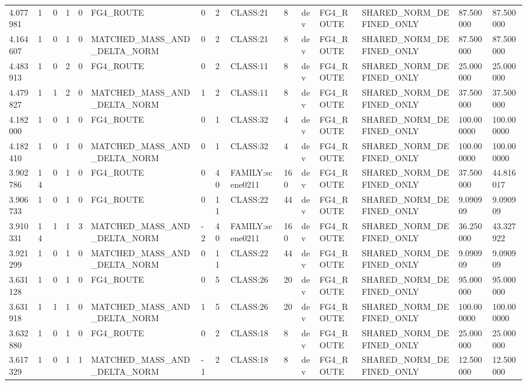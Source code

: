 \begin{tabular}{lllllllllllllll}
4.077981 & 1 & 0 & 1 & 0 & FG4\_ROUTE & 0 & 2 & CLASS:21 & 8 & dev & FG4\_ROUTE & SHARED\_NORM\_DEFINED\_ONLY & 87.500000 & 87.500000 \\
4.164607 & 1 & 0 & 1 & 0 & MATCHED\_MASS\_AND\_DELTA\_NORM & 0 & 2 & CLASS:21 & 8 & dev & FG4\_ROUTE & SHARED\_NORM\_DEFINED\_ONLY & 87.500000 & 87.500000 \\
4.483913 & 1 & 0 & 2 & 0 & FG4\_ROUTE & 0 & 2 & CLASS:11 & 8 & dev & FG4\_ROUTE & SHARED\_NORM\_DEFINED\_ONLY & 25.000000 & 25.000000 \\
4.479827 & 1 & 1 & 2 & 0 & MATCHED\_MASS\_AND\_DELTA\_NORM & 1 & 2 & CLASS:11 & 8 & dev & FG4\_ROUTE & SHARED\_NORM\_DEFINED\_ONLY & 37.500000 & 37.500000 \\
4.182000 & 1 & 0 & 1 & 0 & FG4\_ROUTE & 0 & 1 & CLASS:32 & 4 & dev & FG4\_ROUTE & SHARED\_NORM\_DEFINED\_ONLY & 100.000000 & 100.000000 \\
4.182410 & 1 & 0 & 1 & 0 & MATCHED\_MASS\_AND\_DELTA\_NORM & 0 & 1 & CLASS:32 & 4 & dev & FG4\_ROUTE & SHARED\_NORM\_DEFINED\_ONLY & 100.000000 & 100.000000 \\
3.902786 & 14 & 0 & 1 & 0 & FG4\_ROUTE & 0 & 40 & FAMILY:scene0211 & 160 & dev & FG4\_ROUTE & SHARED\_NORM\_DEFINED\_ONLY & 37.500000 & 44.816017 \\
3.906733 & 1 & 0 & 1 & 0 & FG4\_ROUTE & 0 & 11 & CLASS:22 & 44 & dev & FG4\_ROUTE & SHARED\_NORM\_DEFINED\_ONLY & 9.090909 & 9.090909 \\
3.910331 & 14 & 1 & 1 & 3 & MATCHED\_MASS\_AND\_DELTA\_NORM & -2 & 40 & FAMILY:scene0211 & 160 & dev & FG4\_ROUTE & SHARED\_NORM\_DEFINED\_ONLY & 36.250000 & 43.327922 \\
3.921299 & 1 & 0 & 1 & 0 & MATCHED\_MASS\_AND\_DELTA\_NORM & 0 & 11 & CLASS:22 & 44 & dev & FG4\_ROUTE & SHARED\_NORM\_DEFINED\_ONLY & 9.090909 & 9.090909 \\
3.631128 & 1 & 0 & 1 & 0 & FG4\_ROUTE & 0 & 5 & CLASS:26 & 20 & dev & FG4\_ROUTE & SHARED\_NORM\_DEFINED\_ONLY & 95.000000 & 95.000000 \\
3.631918 & 1 & 1 & 1 & 0 & MATCHED\_MASS\_AND\_DELTA\_NORM & 1 & 5 & CLASS:26 & 20 & dev & FG4\_ROUTE & SHARED\_NORM\_DEFINED\_ONLY & 100.000000 & 100.000000 \\
3.632880 & 1 & 0 & 1 & 0 & FG4\_ROUTE & 0 & 2 & CLASS:18 & 8 & dev & FG4\_ROUTE & SHARED\_NORM\_DEFINED\_ONLY & 25.000000 & 25.000000 \\
3.617329 & 1 & 0 & 1 & 1 & MATCHED\_MASS\_AND\_DELTA\_NORM & -1 & 2 & CLASS:18 & 8 & dev & FG4\_ROUTE & SHARED\_NORM\_DEFINED\_ONLY & 12.500000 & 12.500000 \\

\end{tabular}
